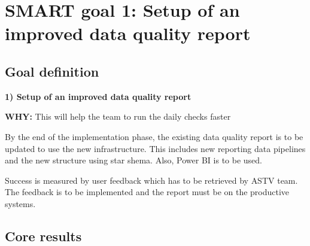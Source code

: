 \section{SMART goal 1: Setup of an improved data quality report}
\subsection*{Goal definition}
\textbf{1) Setup of an improved data quality report}
    
\textbf{WHY:} This will help the team to run the daily checks faster

By the end of the implementation phase, the existing data quality report is to be updated to use the new infrastructure. This includes new reporting data pipelines and the new structure using star shema. Also, Power BI is to be used.

Success is measured by user feedback which has to be retrieved by \gls{ASTV} team. The feedback is to be implemented and the report must be on the productive systems.





\subsection*{Core results}

